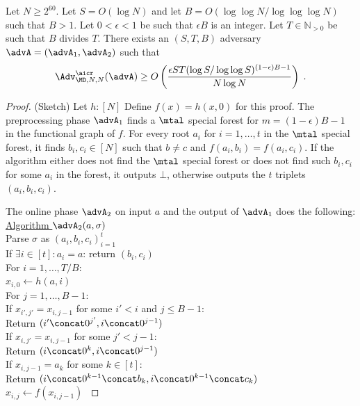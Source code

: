 \begin{theorem}\label{thm:atk}
    Let $N\geq 2^{60}$. Let $S=O(\log N)$ and let $B=O(\log \log N/\log \log \log N)$ such that $B>1$. Let $0<\epsilon<1$ be such that $\epsilon B$ is an integer. Let $T\in \mathbb{N}_{>0}$ be such that $B$ divides $T$. There exists an $(S,T,B)$ adversary $\advA=(\advA_1,\advA_2)$ such that 
    \[\Adv^{\aicr}_{\MD,N,N}(\advA)\geq O\left(\frac{\epsilon ST(\log S/\log \log S)^{(1-\epsilon)B-1}}{N\log N}\right)\;.\] 
\end{theorem}
\begin{proof}(Sketch)
Let $h:[N]$
Define $f(x)=h(x,0)$ for this proof.
The preprocessing phase $\advA_1$ finds a $\mtal$ special forest for $m=(1-\epsilon)B-1$ in the functional graph of $f$. For every root $a_i$ for $i=1,\ldots,t$ in the $\mtal$ special forest, it finds $b_i,c_i\in [N]$ such that $b\neq c$ and $f(a_i,b_i)=f(a_i,c_i)$. If the algorithm either does not find the $\mtal$ special forest or does not find such $b_i,c_i$ for some $a_i$ in the forest, it outputs $\bot$, otherwise outputs the $t$ triplets $(a_i,b_i,c_i)$.


The online phase $\advA_2$ on input $a$ and the output of $\advA_1$ does the following:
\ifnum{}
	\renewcommand{\len}{0.35}
	\renewcommand{\lenn}{0.55}
	\renewcommand{\lennn}{}
\else
	\renewcommand{\len}{0.35}
	\renewcommand{\lenn}{0.55}
	\renewcommand{\lennn}{}
\fi
    \oneCol{\len}
    {
    \underline{Algorithm $\advA_2(a,\sigma)$}\\[0.2ex]
    Parse $\sigma$ as $(a_i,b_i,c_i)_{i=1}^t$\\
    If $\exists i\in [t]: a_i=a$: return $(b_i,c_i)$\\
    For $i=1,\ldots,T/B$:\\
    \ind $x_{i,0}\gets h(a,i)$\\
    \ind For $j=1,\ldots,B-1$:\\
    \ind \ind If $ x_{i',j'}=x_{i,j-1}$ for some $i'<i$ and $j\leq B-1$:\\
    \ind \ind Return $(i'\concat 0^{j'},i \concat 0^{j-1})$\\
    \ind \ind If $ x_{i,j'}=x_{i,j-1}$ for some $j'<j-1$:\\
    \ind \ind Return $(i\concat 0^{k},i \concat 0^{j-1})$\\
    \ind \ind If $ x_{i,j-1}=a_{k}$ for some $k\in [t]$:\\
    \ind \ind Return $(i\concat 0^{k-1}\concat b_k,i\concat 0^{k-1}\concat c_k)$\\
    \ind $x_{i,j}\gets f(x_{i,j-1})$  
	}


\end{proof}
